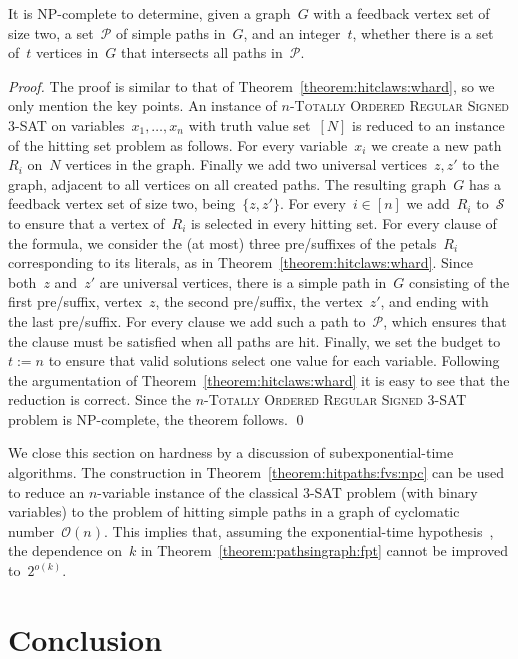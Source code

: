 \let\accentvec\vec  \documentclass{llncs}
\newcommand{\Oh}{{\mathcal{O}}}
\renewcommand{\S}{\ensuremath{\mathcal{S}}\xspace}
\renewcommand{\P}{\ensuremath{\mathcal{P}}\xspace}
\newcommand{\SignedThreeSatn}{\textsc{$n$-Totally Ordered Regular Signed 3-SAT}\xspace}
\begin{document}
\begin{theorem} \label{theorem:hitpaths:fvs:npc}
It is NP-complete to determine, given a graph~$G$ with a feedback vertex set of size two, a set~$\P$ of simple paths in~$G$, and an integer~$t$, whether there is a set of~$t$ vertices in~$G$ that intersects all paths in~$\P$.
\end{theorem}
\begin{proof}
The proof is similar to that of Theorem~\ref{theorem:hitclaws:whard}, so we only mention the key points. An instance of \SignedThreeSatn on variables~$x_1, \ldots, x_n$ with truth value set~$[N]$ is reduced to an instance of the hitting set problem as follows. For every variable~$x_i$ we create a new path~$R_i$ on~$N$ vertices in the graph. Finally we add two universal vertices~$z, z'$ to the graph, adjacent to all vertices on all created paths. The resulting graph~$G$ has a feedback vertex set of size two, being~$\{z,z'\}$. For every~$i \in [n]$ we add~$R_i$ to~$\S$ to ensure that a vertex of~$R_i$ is selected in every hitting set. For every clause of the formula, we consider the (at most) three pre/suffixes of the petals~$R_i$ corresponding to its literals, as in Theorem~\ref{theorem:hitclaws:whard}. Since both~$z$ and~$z'$ are universal vertices, there is a simple path in~$G$ consisting of the first pre/suffix, vertex~$z$, the second pre/suffix, the vertex~$z'$, and ending with the last pre/suffix. For every clause we add such a path to~$\P$, which ensures that the clause must be satisfied when all paths are hit. Finally, we set the budget to~$t := n$ to ensure that valid solutions select one value for each variable. Following the argumentation of Theorem~\ref{theorem:hitclaws:whard} it is easy to see that the reduction is correct. Since the \SignedThreeSatn problem is NP-complete, the theorem follows.
\qed
\end{proof}

We close this section on hardness by a discussion of subexponential-time algorithms. The construction in Theorem~\ref{theorem:hitpaths:fvs:npc} can be used to reduce an $n$-variable instance of the classical 3-SAT problem (with binary variables) to the problem of hitting simple paths in a graph of cyclomatic number~$\Oh(n)$. This implies that, assuming the exponential-time hypothesis~\cite{ImpagliazzoPZ01}, the dependence on~$k$ in Theorem~\ref{theorem:pathsingraph:fpt} cannot be improved to~$2^{o(k)}$.

\section{Conclusion}
\end{document}
